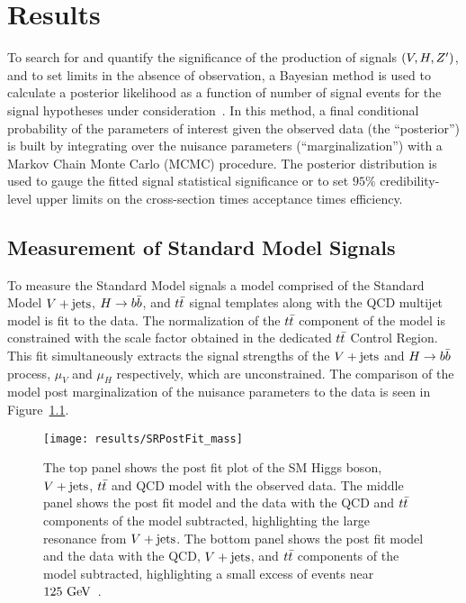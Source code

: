 \chapter{Results}\label{chapter:results}

To search for and quantify the significance of the production of signals $\left(V, H, Z'\right)$, and to set limits in the absence of observation, a Bayesian method is used to calculate a posterior likelihood as a function of number of signal events for the signal hypotheses under consideration~\cite{EXOT-2010-07}.
In this method, a final conditional probability of the parameters of interest given the observed data (the ``posterior'') is built by integrating over the nuisance parameters (``marginalization'') with a Markov Chain Monte Carlo (\Gls{MCMC}) procedure.
The posterior distribution is used to gauge the fitted signal statistical significance or to set $95\%$ credibility-level upper limits on the cross-section times acceptance times efficiency.

\section{Measurement of Standard Model Signals}

To measure the Standard Model signals a model comprised of the Standard Model $V + \text{jets}$, $H \to b\bar{b}$, and $t\bar{t}$ signal templates along with the QCD multijet model is fit to the data.
The normalization of the $t\bar{t}$ component of the model is constrained with the scale factor obtained in the dedicated $t\bar{t}$ Control Region.
This fit simultaneously extracts the signal strengths of the $V + \text{jets}$ and $H \to b\bar{b}$ process, $\mu_{V}$ and $\mu_{H}$ respectively, which are unconstrained.
The comparison of the model post marginalization of the nuisance parameters to the data is seen in Figure~\ref{fig:post_fit}.

\begin{figure}[htbp]
 \centering
 \texttt{[image: results/SRPostFit\_mass]}
 \caption{The top panel shows the post fit plot of the SM Higgs boson, $V + \text{jets}$, $t\bar{t}$ and QCD model with the observed data.
  The middle panel shows the post fit model and the data with the QCD and $t\bar{t}$ components of the model subtracted, highlighting the large resonance from $V + \text{jets}$.
  The bottom panel shows the post fit model and the data with the QCD, $V + \text{jets}$, and $t\bar{t}$ components of the model subtracted, highlighting a small excess of events near $125~\mathrm{GeV}$~\cite{ATLAS-CONF-2018-052}.
 }
 \label{fig:post_fit}
\end{figure}

